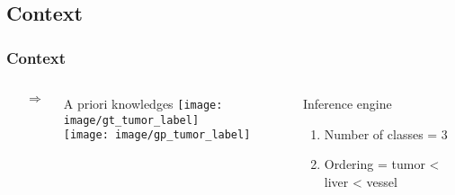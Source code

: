 	\subsection[Context]{Context}
		\begin{frame}
			\frametitle{Context}
			\begin{columns}[c]	
			\column{8em}			
				\begin{center}
					\\
					\vspace{1em}
					\\
				\end{center}
			\column{0.1em}
				$\Rightarrow$
			\column{17em}			
				\begin{exampleblock}{A priori knowledges}
					\texttt{[image: image/gt\_tumor\_label]}\\
					\texttt{[image: image/gp\_tumor\_label]}
				\end{exampleblock}
				\begin{block}{Inference engine}
					\begin{enumerate}
						\item Number of classes = 3
						\item Ordering = tumor < liver < vessel
					\end{enumerate}				
				\end{block}
			\end{columns}					
		\end{frame}

